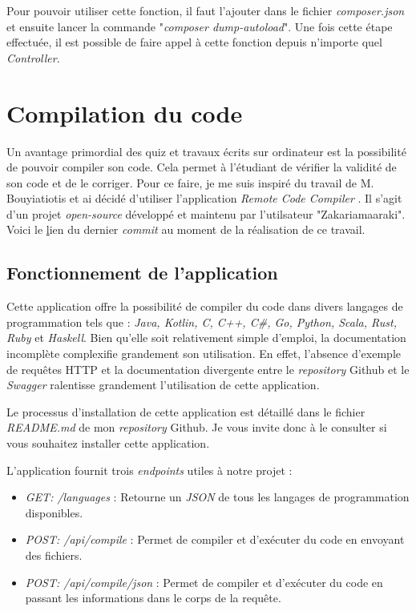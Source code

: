 Pour pouvoir utiliser cette fonction, il faut l'ajouter dans le fichier \emph{composer.json} et ensuite lancer la commande "\emph{composer dump-autoload}". Une fois cette étape  effectuée, il est possible de faire appel à cette fonction depuis n'importe quel \emph{Controller}.


\section{Compilation du code}
Un avantage primordial des quiz et travaux écrits sur ordinateur est la possibilité de pouvoir compiler son code. Cela permet à l'étudiant de vérifier la validité de son code et de le corriger. Pour ce faire, je me suis inspiré du travail de M. Bouyiatiotis et ai décidé d'utiliser l'application \emph{Remote Code Compiler} \cite{RemoteCodeCompiler}. Il s'agit d'un projet \emph{open-source} développé et maintenu par l'utilsateur "Zakariamaaraki". Voici le \href{https://github.com/heig-vd-tin/heig-quiz/commit/28fb1ac5367931f6aa986041fb992c651c9816cd}lien du dernier {\emph{commit}} au moment de la réalisation de ce travail.

\subsection{Fonctionnement de l'application}

Cette application offre la possibilité de compiler du code dans divers langages de programmation tels que : \emph{Java, Kotlin, C, C++, C\#, Go, Python, Scala, Rust, Ruby} et \emph{Haskell}.
Bien qu'elle soit relativement simple d'emploi, la documentation incomplète complexifie grandement son utilisation. En effet, l'absence d'exemple de requêtes HTTP et la documentation divergente entre le \emph{repository} Github et le \emph{Swagger} ralentisse grandement l'utilisation de cette application.

Le processus d'installation de cette application est détaillé dans le fichier \emph{README.md} de mon \emph{repository} Github. Je vous invite donc à le consulter si vous souhaitez installer cette application.

L'application fournit trois \emph{endpoints} utiles à notre projet :
\begin{itemize}
    \item \emph{GET: /languages} : Retourne un \emph{JSON} de tous les langages de programmation disponibles.
    \item \emph{POST: /api/compile} : Permet de compiler et d'exécuter du code en envoyant des fichiers.
    \item \emph{POST: /api/compile/json} : Permet de compiler et d'exécuter du code en passant les informations dans le corps de la requête.
\end{itemize}


